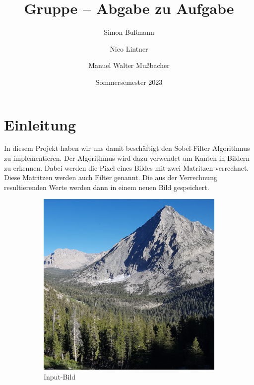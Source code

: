 \documentclass[course=erap]{aspdoc}
\author{Simon Bußmann \and Nico Lintner \and Manuel Walter Mußbacher}
\date{Sommersemester 2023}
\title{Gruppe \theGroup{} -- Abgabe zu Aufgabe \theNumber}
\begin{document}
\maketitle

\section{Einleitung}

In diesem Projekt haben wir uns damit beschäftigt den Sobel-Filter Algorithmus zu implementieren.
Der Algorithmus wird dazu verwendet um Kanten in Bildern zu erkennen.
Dabei werden die Pixel eines Bildes mit zwei Matritzen verrechnet.
Diese Matritzen werden auch Filter genannt.
Die aus der Verrechnung resultierenden Werte werden dann in einem neuen Bild gespeichert.
\begin{figure}[H]
    \begin{subfigure}{.5\columnwidth}
        \centering
        \includegraphics[width=\columnwidth]{graphics/johnmuirtrail.png}
        \caption{Input-Bild}
        \label{fig:input-bild}
    \end{subfigure}
    \begin{subfigure}{.5\columnwidth}
        \centering

\end{subfigure}
\end{figure}
\end{document}
